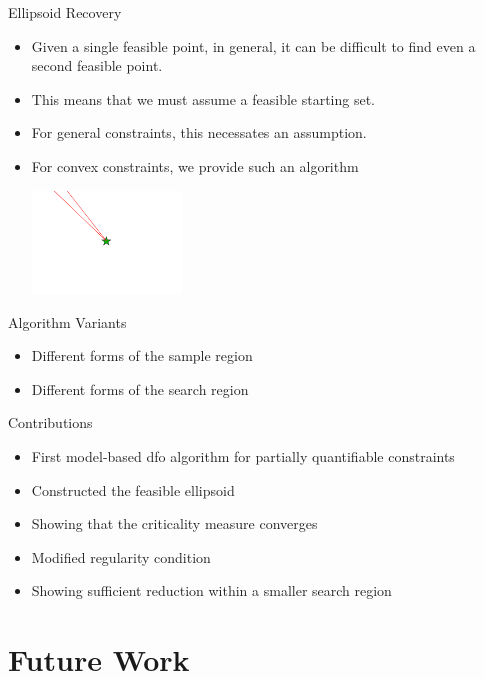 \documentclass{beamer}
\begin{document}
\begin{frame}{Ellipsoid Recovery}
\begin{itemize}
	\item Given a single feasible point, in general, it can be difficult to find even a second feasible point.
	\item This means that we must assume a feasible starting set.
	\item For general constraints, this necessates an assumption.
	\item For convex constraints, we provide such an algorithm
	\begin{center}
		\includegraphics[width=150px]{images/only_one_feasible_point.png}
	\end{center}
\end{itemize}
\end{frame}


\begin{frame}{Algorithm Variants}
\begin{itemize}
	\item Different forms of the sample region
	\item Different forms of the search region
\end{itemize}
\end{frame}


\begin{frame}{Contributions}
	\begin{itemize}
		\item First model-based dfo algorithm for partially quantifiable constraints
		\item Constructed the feasible ellipsoid
		\item Showing that the criticality measure converges
		\item Modified regularity condition
		\item Showing sufficient reduction within a smaller search region
	\end{itemize}
\end{frame}



\section{Future Work}
\end{document}

